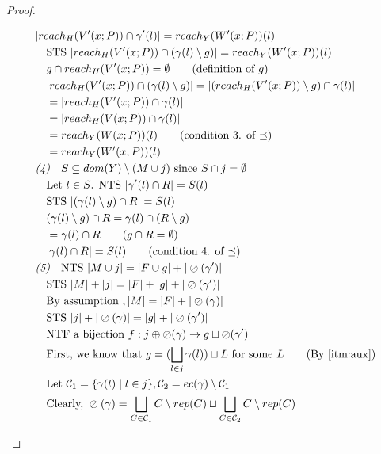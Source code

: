 \documentclass[11pt]{article}
\newcommand{\oh}[1]{\oslash(#1)}
\theoremstyle{definition}
\begin{document}
\begin{proof}
\begin{description}
\begin{align*}
		&|reach_{H}(V'(x;P)) \cap \gamma'(l)| = reach_{Y}(W'(x;P))(l)\\ 
		&\quad \text{STS } |reach_{H}(V'(x;P)) \cap (\gamma(l) \setminus g)| = reach_{Y}(W'(x;P))(l) \\
		&\quad g \cap reach_H(V'(x;P)) = \emptyset \tag{definition of $g$}\\
		&\quad |reach_{H}(V'(x;P)) \cap (\gamma(l) \setminus g)| = 
				|(reach_{H}(V'(x;P)) \setminus g) \cap \gamma(l)|\\
		&\quad = |reach_{H}(V'(x;P)) \cap \gamma(l)|\\
		&\quad = |reach_{H}(V(x;P)) \cap \gamma(l)|\\
		&\quad = reach_{Y}(W(x;P))(l) \tag{condition 3. of $\preceq$}\\
		&\quad = reach_{Y}(W'(x;P))(l) \\
		&\emph{(4)}\quad S \subseteq dom(Y) \setminus (M \cup j) \text{ since } S \cap j = \emptyset\\
		&\quad \text{Let } l \in S \text{. NTS } |\gamma'(l) \cap R| = S(l)\\
		&\quad \text{STS } |(\gamma(l)\setminus g) \cap R| = S(l)\\
		&\quad (\gamma(l)\setminus g) \cap R = \gamma(l) \cap (R \setminus g)\\
		&\quad = \gamma(l) \cap R \tag{$g \cap R = \emptyset$}\\
		&\quad |\gamma(l) \cap R| = S(l) \tag{condition 4. of $\preceq$}\\
		&\emph{(5)}\quad \text{NTS } |M \cup j| = |F \cup g| + |\oh{\gamma'}|\\
		&\quad \text{STS } |M| + |j| = |F| + | g| + |\oh{\gamma'}|\\
		&\quad \text{By assumption }, |M| = |F| + |\oh{\gamma}|\\
		&\quad \text{STS } |j| + |\oh{\gamma}| = |g| + |\oh{\gamma'}|\\
		&\quad \text{NTF a bijection } f : j \oplus \oh{\gamma} \to g \sqcup \oh{\gamma'}\\
		&\quad \text{First, we know that } g = (\bigsqcup_{l \in j} \gamma(l)) \sqcup L 
			\text{ for some } L \tag{By \ref{itm:aux}}\\
		&\quad \text{Let } \mathcal{C}_1 = \{\gamma(l) \mid l \in j\},
				\mathcal{C}_2 = ec(\gamma) \setminus \mathcal{C}_1\\
		&\quad \text{Clearly, } \oh{\gamma} = 
		\bigsqcup_{C  \in \mathcal{C}_1} C \setminus rep(C) \sqcup \bigsqcup_{C  \in \mathcal{C}_2} C \setminus rep(C)\\

\end{align*}
\end{description}
\end{proof}
\end{document}
